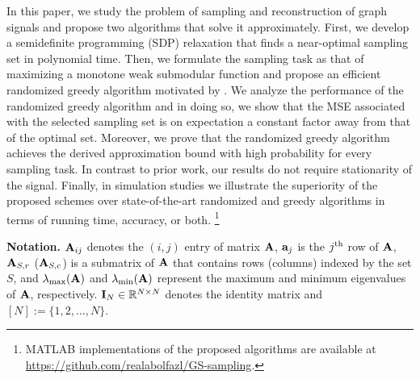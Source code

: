 In this paper, we study the problem of sampling and reconstruction of graph signals and propose two algorithms that solve it approximately. First, we develop a semidefinite programming (SDP) relaxation that finds a near-optimal sampling set in polynomial time. Then, we formulate the sampling task as that of maximizing a monotone weak submodular function and propose an efficient randomized greedy algorithm motivated by \cite{mirzasoleiman2014lazier}. We analyze the performance of the randomized greedy algorithm and in doing so, we show that the MSE associated with the selected sampling set is on expectation a constant factor away from that of the optimal set. Moreover, we prove that the randomized greedy algorithm achieves the derived approximation bound with high probability for every sampling task.  
In contrast to prior work, our results do not require stationarity of the signal. Finally, in simulation studies we illustrate the superiority of the proposed schemes over state-of-the-art randomized and greedy algorithms \cite{chen2016signal,chamon2017greedy} in terms of running time, accuracy, or both.
\footnote{MATLAB implementations of the proposed algorithms are available at \url{https://github.com/realabolfazl/GS-sampling}.} 


\noindent\textbf{Notation.} 
${\mathbf A}_{ij}$ denotes the $(i,j)$ entry of matrix ${\mathbf A}$, ${\mathbf a}_j$ is the $j\textsuperscript{th}$ row of ${\mathbf A}$, ${\mathbf A}_{S,r}$ (${\mathbf A}_{S,c}$) is a submatrix of ${\mathbf A}$ that contains rows (columns) indexed by the set $S$, and $\lambda_{\max}({\mathbf A})$
and $\lambda_{\min}({\mathbf A})$ represent the maximum and minimum eigenvalues of ${\mathbf A}$, respectively. ${\mathbf I}_N \in {\mathbb{R}}^{N\times N}$ denotes the identity matrix and $[N] := \{1,2,\dots,N\}$.